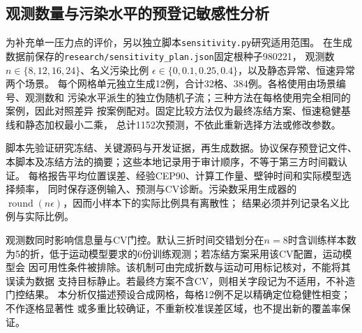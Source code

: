 \subsection{观测数量与污染水平的预登记敏感性分析}
\label{sec:sensitivity-protocol}

为补充单一压力点的评价，另以独立脚本\texttt{sensitivity.py}研究适用范围。
在生成数据前保存的\texttt{research/sensitivity\_plan.json}固定根种子980221，
观测数$n\in\{8,12,16,24\}$、名义污染比例
$\epsilon\in\{0,0.1,0.25,0.4\}$，以及静态异常、恒速异常两个场景。
每个网格单元独立生成12例，合计32格、384例。各格使用由场景编号、观测数和
污染水平派生的独立伪随机子流；三种方法在每格使用完全相同的案例，因此对照差异
按案例配对。固定比较方法仅为最终冻结方案、恒速稳健基线和静态加权最小二乘，
总计1152次预测，不依此重新选择方法或修改参数。

脚本先验证研究冻结、关键源码与开发证据，再生成数据。协议保存预登记文件、
本脚本及冻结方法的摘要；这些本地记录用于审计顺序，不等于第三方时间戳认证。
每格报告平均位置误差、经验CEP90、计算工作量、壁钟时间和实际模型选择频率，
同时保存逐例输入、预测与CV诊断。污染数采用生成器的
$\operatorname{round}(n\epsilon)$，因而小样本下的实际比例具有离散性；
结果必须并列记录名义比例与实际比例。

观测数同时影响信息量与CV门控。默认三折时间交错划分在$n=8$时含训练样本数
为5的折，低于运动模型要求的6份训练观测；若冻结方案采用该CV配置，运动模型会
因可用性条件被排除。该机制可由完成折数与运动可用标记核对，不能将其误读为数据
支持目标静止。若最终方案不含CV，则相关字段记为不适用，不补造门控结果。
本分析仅描述预设合成网格，每格12例不足以精确定位稳健性相变；不作逐格显著性
或多重比较确证，不重新校准误差区域，也不提出新的覆盖率保证。
